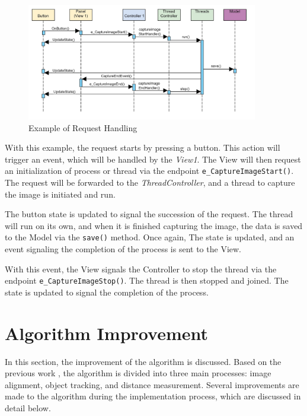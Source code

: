 \begin{figure}[!ht]
    \centering
    \includegraphics[width=0.9\textwidth]{texs/Part2/chapter4/image/sequence.jpg}
    \caption{Example of Request Handling}
    \label{fig:sequence_diagram}
\end{figure}

With this example, the request starts by pressing a button. This action will trigger an event, which will be handled by the \textit{View1}. The View will then request an initialization of process or thread via the endpoint \texttt{e\_CaptureImageStart()}. The request will be forwarded to the \textit{ThreadController}, and a thread to capture the image is initiated and run.

The button state is updated to signal the succession of the request. The thread will run on its own, and when it is finished capturing the image, the data is saved to the Model via the \texttt{save()} method. Once again, The state is updated, and an event signaling the completion of the process is sent to the View.

With this event, the View signals the Controller to stop the thread via the endpoint \texttt{e\_CaptureImageStop()}. The thread is then stopped and joined. The state is updated to signal the completion of the process.

\section{Algorithm Improvement}
\label{sec:algorithm_improvement}

In this section, the improvement of the algorithm is discussed. Based on the previous work \cite{Sabtu_2023}, the algorithm is divided into three main processes: image alignment, object tracking, and distance measurement. Several improvements are made to the algorithm during the implementation process, which are discussed in detail below.

